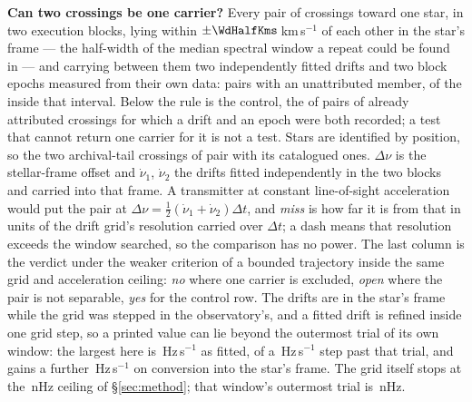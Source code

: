 \begin{table}
\centering
\caption{\textbf{Can two crossings be one carrier?} Every pair of crossings
toward one star, in two execution blocks, lying within
$\pm\WdHalfKms$\,km\,s$^{-1}$ of each other in the star's frame --- the
half-width of the median spectral window a repeat could be found in --- and
carrying between them two independently fitted drifts and two block epochs
measured from their own data: \TjNPair{} pairs with an unattributed member,
of the \TjNCandPair{} inside that interval. Below the rule is the control, the
\TjNCandAttrTest{} of \TjNCandAttr{} pairs of already attributed crossings for
which a drift and an epoch were both recorded; a test that cannot return one
carrier for it is not a test. Stars are
identified by position, so the two archival-tail crossings of \TjDeepStar{}
pair with its catalogued ones. $\Delta\nu$ is the stellar-frame offset and
$\dot\nu_1$, $\dot\nu_2$ the drifts fitted independently in the two blocks
and carried into that frame. A transmitter at constant line-of-sight
acceleration would put the pair at
$\Delta\nu=\frac{1}{2}(\dot\nu_1+\dot\nu_2)\Delta t$, and \emph{miss} is how
far it is from that in units of the drift grid's resolution carried over
$\Delta t$; a dash means that resolution exceeds the window searched, so the
comparison has no power. The last column is the verdict under the weaker
criterion of a bounded trajectory inside the same grid and acceleration
ceiling: \emph{no} where one carrier is excluded, \emph{open} where the pair
is not separable, \emph{yes} for the control row. The drifts are in the star's
frame while the grid was stepped in the observatory's, and a fitted drift is
refined inside one grid step, so a printed value can lie beyond the outermost
trial of its own window: the largest here is \TjGridTopoHzS\,Hz\,s$^{-1}$ as
fitted, \TjGridOverStep{} of a \TjGridStepHzS\,Hz\,s$^{-1}$ step past that
trial, and gains a further \TjGridFrameHzS\,Hz\,s$^{-1}$ on conversion into
the star's frame. The grid itself stops at the \DriftCeilLo\,nHz ceiling of
\S\ref{sec:method}; that window's outermost trial is \TjGridEdgeNHz\,nHz.}
\label{tab:pairs}
\scriptsize

\end{table}

